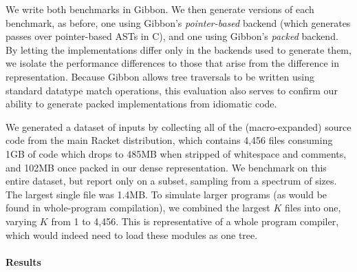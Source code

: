 \documentclass[a4paper,english]{lipics-v2016}
\newcommand{\treelang}{Gibbon\xspace} %
\begin{document}
We write both benchmarks in \treelang{}. We then generate versions of each
benchmark, as before, one using \treelang{}'s {\em pointer-based} backend (which
generates passes over pointer-based ASTs in C), and one using \treelang{}'s
{\em packed} backend. By letting the
implementations differ only in the backends used to generate them, we isolate
the performance differences to those that arise from the difference in
representation. Because \treelang{} allows tree traversals to be written
using standard datatype match operations, this evaluation also
serves to confirm our ability to generate packed implementations from
idiomatic code.

We generated a dataset of inputs by collecting all of the (macro-expanded) source
code from the main Racket distribution, which contains 4,456 files consuming
1GB of code which drops to 485MB when stripped of whitespace and comments, and 
102MB once packed in our dense representation.
%
We benchmark on this entire dataset, but report only on a subset, sampling from
a spectrum of sizes.
%
The largest single file was 1.4MB. 
To simulate larger programs (as would be found in whole-program compilation), we
combined the largest $K$ files into one, varying $K$ from 1 to 4,456.
%
This is representative of a whole program compiler, which would indeed need to
load these modules as one tree.
%
%

\paragraph*{Results}
\end{document}
